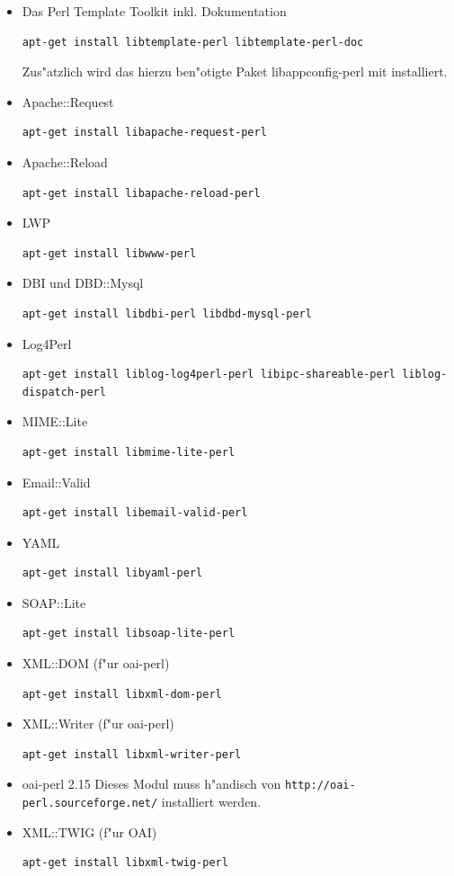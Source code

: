 \documentclass[11pt, twoside, a4paper, BCOR8mm, DIV12, bibtotoc,idxtotoc]{scrbook}
\begin{document}
\begin{itemize}
\item Das Perl Template Toolkit inkl. Dokumentation
\begin{verbatim}
apt-get install libtemplate-perl libtemplate-perl-doc
\end{verbatim}
  Zus"atzlich wird das hierzu ben"otigte Paket libappconfig-perl mit
  installiert.
\item Apache::Request
\begin{verbatim}
apt-get install libapache-request-perl
\end{verbatim}
\item Apache::Reload
\begin{verbatim}
apt-get install libapache-reload-perl
\end{verbatim}
\item LWP
\begin{verbatim}
apt-get install libwww-perl
\end{verbatim}
\item DBI und DBD::Mysql
\begin{verbatim}
apt-get install libdbi-perl libdbd-mysql-perl
\end{verbatim}
\item Log4Perl
\begin{verbatim}
apt-get install liblog-log4perl-perl libipc-shareable-perl liblog-dispatch-perl
\end{verbatim}
\item MIME::Lite
\begin{verbatim}
apt-get install libmime-lite-perl
\end{verbatim}
\item Email::Valid
\begin{verbatim}
apt-get install libemail-valid-perl
\end{verbatim}
\item YAML
\begin{verbatim}
apt-get install libyaml-perl
\end{verbatim}
\item SOAP::Lite
\begin{verbatim}
apt-get install libsoap-lite-perl
\end{verbatim}
\item XML::DOM (f"ur oai-perl)
\begin{verbatim}
apt-get install libxml-dom-perl
\end{verbatim}
\item XML::Writer (f"ur oai-perl)
\begin{verbatim}
apt-get install libxml-writer-perl
\end{verbatim}
\item oai-perl 2.15
Dieses Modul muss h"andisch von
\texttt{http://oai-perl.sourceforge.net/} installiert werden.
\item XML::TWIG (f"ur OAI)
\begin{verbatim}
apt-get install libxml-twig-perl
\end{verbatim}
\end{itemize}
\end{document}
